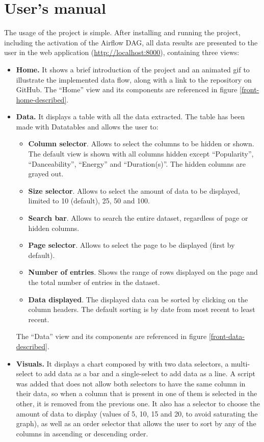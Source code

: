\section{User's manual} \label{usermanual}

\nonzeroparskip The usage of the project is simple. After installing and running the project, including the activation of the Airflow DAG, all data results are presented to the user in the web application (\url{http://localhost:8000}), containing three views:
\begin{itemize}
	 \item \textbf{Home.} It shows a brief introduction of the project and an animated gif to illustrate the implemented data flow, along with a link to the repository on GitHub. The ``Home'' view and its components are referenced in figure \ref{front-home-described}.
	 \item \textbf{Data.} It displays a table with all the data extracted. The table has been made with Datatables and allows the user to:
	 \begin{itemize}
	 	\item \textbf{Column selector}. Allows to select the columns to be hidden or shown. The default view is shown with all columns hidden except ``Popularity'', ``Danceability'', ``Energy'' and ``Duration(s)''. The hidden columns are grayed out.
	 	\item \textbf{Size selector}. Allows to select the amount of data to be displayed, limited to 10 (default), 25, 50 and 100.
	 	\item \textbf{Search bar}. Allows to search the entire dataset, regardless of page or hidden columns.
	 	\item \textbf{Page selector}. Allows to select the page to be displayed (first by default).
	 	\item \textbf{Number of entries}. Shows the range of rows displayed on the page and the total number of entries in the dataset.
	 	\item \textbf{Data displayed}. The displayed data can be sorted by clicking on the column headers. The default sorting is by date from most recent to least recent.
	 \end{itemize}
	 The ``Data'' view and its components are referenced in figure \ref{front-data-described}.
	 \item \textbf{Visuals.} It displays a chart composed by 
	 with two data selectors, a multi-select to add data as a bar and a single-select to add data as a line. A script was added that does not allow both selectors to have the same column in their data, so when a column that is present in one of them is selected in the other, it is removed from the previous one. It also has a selector to choose the amount of data to display (values of 5, 10, 15 and 20, to avoid saturating the graph), as well as an order selector that allows the user to sort by any of the columns in ascending or descending order.

\end{itemize}
